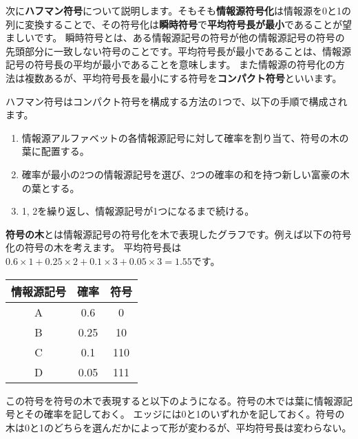 \documentclass{jlreq}
\begin{document}
次に\textbf{ハフマン符号}について説明します。そもそも\textbf{情報源符号化}は情報源を0と1の列に変換することで、その符号化は\textbf{瞬時符号}で\textbf{平均符号長が最小}であることが望ましいです。
瞬時符号とは、ある情報源記号の符号が他の情報源記号の符号の先頭部分に一致しない符号のことです。平均符号長が最小であることは、情報源記号の符号長の平均が最小であることを意味します。
また情報源の符号化の方法は複数あるが、平均符号長を最小にする符号を\textbf{コンパクト符号}といいます。

ハフマン符号はコンパクト符号を構成する方法の1つで、以下の手順で構成されます。

\begin{theorembox}[ハフマン符号の構成]
	\begin{enumerate}
		\item 情報源アルファベットの各情報源記号に対して確率を割り当て、符号の木の葉に配置する。
		\item 確率が最小の2つの情報源記号を選び、2つの確率の和を持つ新しい富豪の木の葉とする。
		\item 1, 2を繰り返し、情報源記号が1つになるまで続ける。
	\end{enumerate}
\end{theorembox}

\textbf{符号の木}とは情報源記号の符号化を木で表現したグラフです。例えば以下の符号化の符号の木を考えます。
平均符号長は$0.6 \times 1 + 0.25 \times 2 + 0.1 \times 3 + 0.05 \times 3 = 1.55$です。

\vspace{0.5cm}

\begin{center}
\begin{tabular}{c|c|c}
	情報源記号 & 確率 & 符号 \\
	\hline
	A & 0.6 & 0 \\
	\hline 
	B & 0.25 & 10 \\
	\hline
	C & 0.1 & 110 \\
	\hline
	D & 0.05 & 111 \\
	\hline
\end{tabular}
\end{center}

\vspace{0.5cm}

この符号を符号の木で表現すると以下のようになる。符号の木では葉に情報源記号とその確率を記しておく。
エッジには0と1のいずれかを記しておく。符号の木は0と1のどちらを選んだかによって形が変わるが、平均符号長は変わらない。
\end{document}
